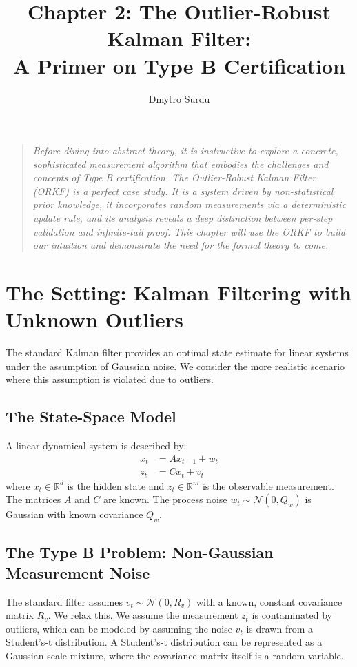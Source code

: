 \documentclass[12pt]{article}
\title{\textbf{Chapter 2: The Outlier-Robust Kalman Filter: \\ A Primer on Type B Certification}}
\author{Dmytro Surdu}
\date{}
\theoremstyle{definition}
\theoremstyle{plain}
\begin{document}
\maketitle

\begin{quote}
\textit{Before diving into abstract theory, it is instructive to explore a concrete, sophisticated measurement algorithm that embodies the challenges and concepts of Type B certification. The Outlier-Robust Kalman Filter (ORKF) is a perfect case study. It is a system driven by non-statistical prior knowledge, it incorporates random measurements via a deterministic update rule, and its analysis reveals a deep distinction between per-step validation and infinite-tail proof. This chapter will use the ORKF to build our intuition and demonstrate the need for the formal theory to come.}
\end{quote}

\section{The Setting: Kalman Filtering with Unknown Outliers}
The standard Kalman filter provides an optimal state estimate for linear systems under the assumption of Gaussian noise. We consider the more realistic scenario where this assumption is violated due to outliers.

\subsection{The State-Space Model}
A linear dynamical system is described by:
\begin{align}
    x_t &= A x_{t-1} + w_t \label{eq:process_model} \\
    z_t &= C x_t + v_t \label{eq
:measurement_model}
\end{align}
where $x_t \in \mathbb{R}^d$ is the hidden state and $z_t \in \mathbb{R}^m$ is the observable measurement. The matrices $A$ and $C$ are known. The process noise $w_t \sim \mathcal{N}(0, Q_w)$ is Gaussian with known covariance $Q_w$.

\subsection{The Type B Problem: Non-Gaussian Measurement Noise}
The standard filter assumes $v_t \sim \mathcal{N}(0, R_v)$ with a known, constant covariance matrix $R_v$. We relax this. We assume the measurement $z_t$ is contaminated by outliers, which can be modeled by assuming the noise $v_t$ is drawn from a Student's-t distribution. A Student's-t distribution can be represented as a Gaussian scale mixture, where the covariance matrix itself is a random variable.
\end{document}

